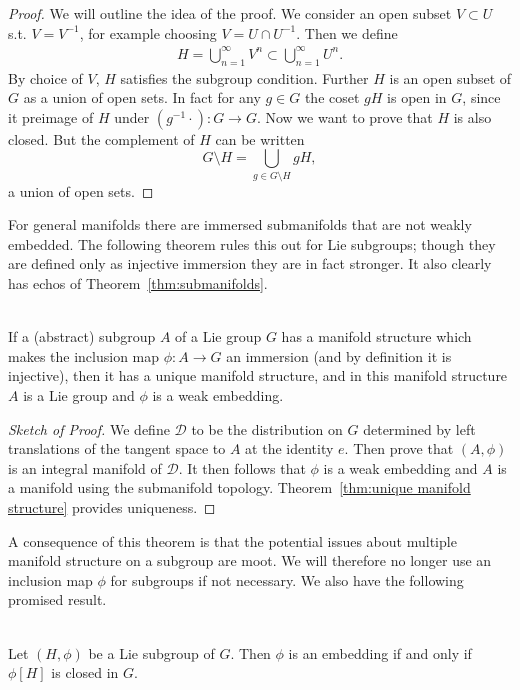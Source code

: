 \begin{proof}
We will outline the idea of the proof. We consider an open subset $V \subset U$ s.t. $V=V^{-1}$, for example choosing $V = U\cap U^{-1}$. Then we define 
\begin{align*}
H = \bigcup_{n=1}^{\infty} V^n \subset \bigcup_{n=1}^{\infty} U^n.
\end{align*}
By choice of $V$, $H$ satisfies the subgroup condition. Further $H$ is an open subset of $G$ as a union of open sets. In fact for any $g \in G$ the coset $gH$ is open in $G$, since it preimage of $H$ under $(g^{-1} \cdot) : G \to G$.
Now we want to prove that $H$ is also closed. But the complement of $H$ can be written
\[
G \setminus H = \bigcup_{g \in G \setminus H} gH,
\]
a union of open sets.
\end{proof}


For general manifolds there are immersed submanifolds that are not weakly embedded. 
The following theorem rules this out for Lie subgroups; though they are defined only as injective immersion they are in fact stronger.
It also clearly has echos of Theorem~\ref{thm:submanifolds}.

\begin{theorem}
\textup{\cite[3.20]{Warner1983}}\\
If a (abstract) subgroup $A$ of a Lie group $G$ has a manifold structure which makes the inclusion map $\phi: A \to G$ an immersion (and by definition it is injective), then it has a unique manifold structure, and in this manifold structure $A$ is a Lie group and $\phi$ is a weak embedding.
\end{theorem}

\begin{proof}[Sketch of Proof]
We define $\mathcal{D}$ to be the distribution on $G$ determined by left translations of the tangent space to $A$ at the identity $e$. 
Then prove that $(A,\phi)$ is an integral manifold of $\mathcal{D}$. 
It then follows that $\phi$ is a weak embedding and $A$ is a manifold using the submanifold topology.
Theorem~\ref{thm:unique manifold structure} provides uniqueness.
\end{proof}

A consequence of this theorem is that the potential issues about multiple manifold structure on a subgroup are moot.
We will therefore no longer use an inclusion map $\phi$ for subgroups if not necessary.
We also have the following promised result.
\begin{theorem}
\textup{\cite[3.21]{Warner1983}}\\
Let $(H,\phi)$ be a Lie subgroup of $G$. Then $\phi$ is an embedding if and only if $\phi[H]$ is closed in $G$.
\end{theorem}





